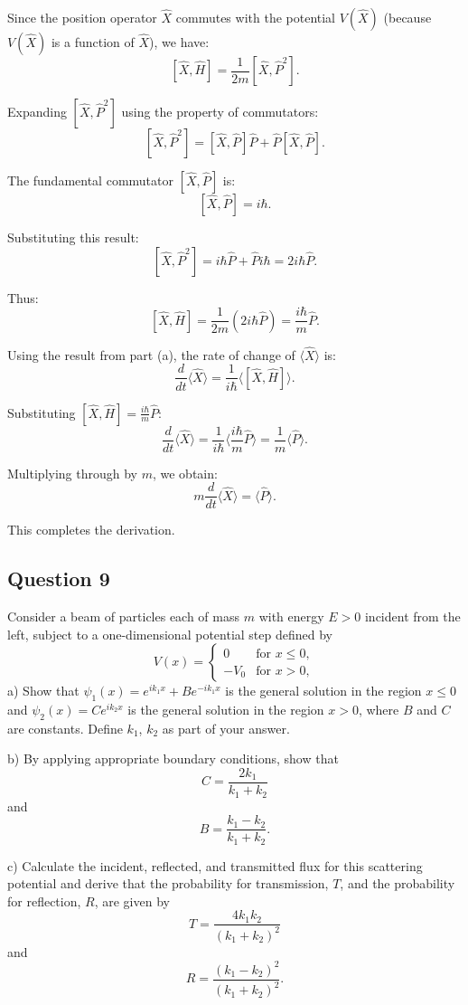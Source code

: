\documentclass{article}
\begin{document}
Since the position operator $\hat{X}$ commutes with the potential $V(\hat{X})$ (because $V(\hat{X})$ is a function of $\hat{X}$), we have:
\[
[\hat{X}, \hat{H}] = \frac{1}{2m} [\hat{X}, \hat{P}^2].
\]

Expanding $[\hat{X}, \hat{P}^2]$ using the property of commutators:
\[
[\hat{X}, \hat{P}^2] = [\hat{X}, \hat{P}] \hat{P} + \hat{P} [\hat{X}, \hat{P}].
\]

The fundamental commutator $[\hat{X}, \hat{P}]$ is:
\[
[\hat{X}, \hat{P}] = i\hbar.
\]

Substituting this result:
\[
[\hat{X}, \hat{P}^2] = i\hbar \hat{P} + \hat{P} i\hbar = 2i\hbar \hat{P}.
\]

Thus:
\[
[\hat{X}, \hat{H}] = \frac{1}{2m} (2i\hbar \hat{P}) = \frac{i\hbar}{m} \hat{P}.
\]

Using the result from part (a), the rate of change of $\langle \hat{X} \rangle$ is:
\[
\frac{d}{dt} \langle \hat{X} \rangle = \frac{1}{i\hbar} \langle [\hat{X}, \hat{H}] \rangle.
\]

Substituting $[\hat{X}, \hat{H}] = \frac{i\hbar}{m} \hat{P}$:
\[
\frac{d}{dt} \langle \hat{X} \rangle = \frac{1}{i\hbar} \langle \frac{i\hbar}{m} \hat{P} \rangle = \frac{1}{m} \langle \hat{P} \rangle.
\]

Multiplying through by $m$, we obtain:
\[
m \frac{d}{dt} \langle \hat{X} \rangle = \langle \hat{P} \rangle.
\]

This completes the derivation.



\subsection{Question 9}
Consider a beam of particles each of mass $m$ with energy $E > 0$ incident from the left, subject to a one-dimensional potential step defined by
\[
V(x) =
\begin{cases}
0 & \text{for } x \leq 0, \\
-V_0 & \text{for } x > 0,
\end{cases}
\]
a) Show that $\psi_1(x) = e^{ik_1x} + Be^{-ik_1x}$ is the general solution in the region $x \leq 0$ and $\psi_2(x) = Ce^{ik_2x}$ is the general solution in the region $x > 0$, where $B$ and $C$ are constants. Define $k_1$, $k_2$ as part of your answer.

b) By applying appropriate boundary conditions, show that
\[
C = \frac{2k_1}{k_1 + k_2}
\]
and
\[
B = \frac{k_1 - k_2}{k_1 + k_2}.
\]

c) Calculate the incident, reflected, and transmitted flux for this scattering potential and derive that the probability for transmission, $T$, and the probability for reflection, $R$, are given by
\[
T = \frac{4k_1k_2}{(k_1 + k_2)^2}
\]
and
\[
R = \frac{(k_1 - k_2)^2}{(k_1 + k_2)^2}.
\]
\end{document}
